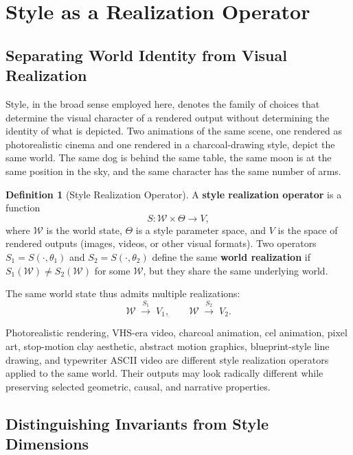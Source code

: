 \documentclass[11pt,a4paper]{article}
\theoremstyle{plain}
\theoremstyle{definition}
\newtheorem{definition}[theorem]{Definition}
\theoremstyle{remark}
\begin{document}
\section{Style as a Realization Operator}
\label{sec:style}

\subsection{Separating World Identity from Visual Realization}

Style, in the broad sense employed here, denotes the family of choices that determine the visual character of a rendered output without determining the identity of what is depicted. Two animations of the same scene, one rendered as photorealistic cinema and one rendered in a charcoal-drawing style, depict the same world. The same dog is behind the same table, the same moon is at the same position in the sky, and the same character has the same number of arms.

\begin{definition}[Style Realization Operator]
A \textbf{style realization operator} is a function
\[
S: \mathcal{W} \times \Theta \to V,
\]
where $\mathcal{W}$ is the world state, $\Theta$ is a style parameter space, and $V$ is the space of rendered outputs (images, videos, or other visual formats). Two operators $S_1 = S(\cdot, \theta_1)$ and $S_2 = S(\cdot, \theta_2)$ define the same \textbf{world realization} if $S_1(\mathcal{W}) \neq S_2(\mathcal{W})$ for some $\mathcal{W}$, but they share the same underlying world.
\end{definition}

The same world state thus admits multiple realizations:
\[
\mathcal{W} \;\xrightarrow{S_1}\; V_1, \qquad \mathcal{W} \;\xrightarrow{S_2}\; V_2.
\]

Photorealistic rendering, VHS-era video, charcoal animation, cel animation, pixel art, stop-motion clay aesthetic, abstract motion graphics, blueprint-style line drawing, and typewriter ASCII video are different style realization operators applied to the same world. Their outputs may look radically different while preserving selected geometric, causal, and narrative properties.

\subsection{Distinguishing Invariants from Style Dimensions}
\end{document}
